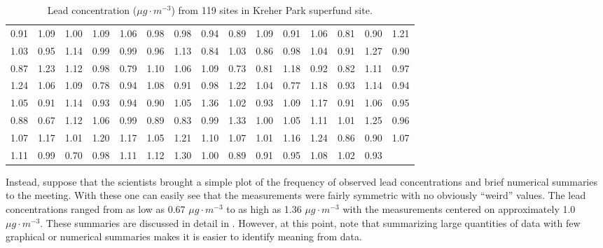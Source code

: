 \documentclass[10pt,openany]{book}\usepackage[]{graphicx}\usepackage[]{color}
\begin{document}
\begin{table}[htbp]   \label{tab:KreherParkPbconc}
  \caption{Lead concentration ($\mu g \cdot m^{-3}$) from 119 sites in Kreher Park superfund site.}
  \begin{center}
\begin{tabular}{rrrrrrrrrrrrrrr}
  \hline
  \hline
0.91 & 1.09 & 1.00 & 1.09 & 1.06 & 0.98 & 0.98 & 0.94 & 0.89 & 1.09 & 0.91 & 1.06 & 0.81 & 0.90 & 1.21 \\ 
  1.03 & 0.95 & 1.14 & 0.99 & 0.99 & 0.96 & 1.13 & 0.84 & 1.03 & 0.86 & 0.98 & 1.04 & 0.91 & 1.27 & 0.90 \\ 
  0.87 & 1.23 & 1.12 & 0.98 & 0.79 & 1.10 & 1.06 & 1.09 & 0.73 & 0.81 & 1.18 & 0.92 & 0.82 & 1.11 & 0.97 \\ 
  1.24 & 1.06 & 1.09 & 0.78 & 0.94 & 1.08 & 0.91 & 0.98 & 1.22 & 1.04 & 0.77 & 1.18 & 0.93 & 1.14 & 0.94 \\ 
  1.05 & 0.91 & 1.14 & 0.93 & 0.94 & 0.90 & 1.05 & 1.36 & 1.02 & 0.93 & 1.09 & 1.17 & 0.91 & 1.06 & 0.95 \\ 
  0.88 & 0.67 & 1.12 & 1.06 & 0.99 & 0.89 & 0.83 & 0.99 & 1.33 & 1.00 & 1.05 & 1.11 & 1.01 & 1.25 & 0.96 \\ 
  1.07 & 1.17 & 1.01 & 1.20 & 1.17 & 1.05 & 1.21 & 1.10 & 1.07 & 1.01 & 1.16 & 1.24 & 0.86 & 0.90 & 1.07 \\ 
  1.11 & 0.99 & 0.70 & 0.98 & 1.11 & 1.12 & 1.30 & 1.00 & 0.89 & 0.91 & 0.95 & 1.08 & 1.02 & 0.93 &  \\ 
   \hline
\end{tabular}

  \end{center}
\end{table}

\vspace{-12pt}
Instead, suppose that the scientists brought a simple plot of the frequency of observed lead concentrations and brief numerical summaries  to the meeting. With these one can easily see that the measurements were fairly symmetric with no obviously ``weird'' values. The lead concentrations ranged from as low as 0.67 $\mu g \cdot m^{-3}$ to as high as 1.36 $\mu g \cdot m^{-3}$ with the measurements centered on approximately 1.0 $\mu g \cdot m^{-3}$. These summaries are discussed in detail in . However, at this point, note that summarizing large quantities of data with few graphical or numerical summaries makes it is easier to identify meaning from data.
\end{document}
